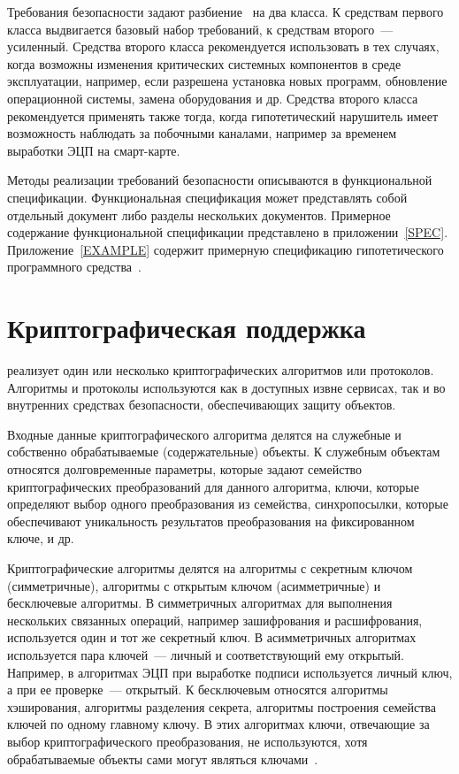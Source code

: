 Требования безопасности задают разбиение~\TOE
на два класса. К средствам первого класса выдвигается 
базовый набор требований, к средствам второго~--- усиленный.
%
Средства второго класса рекомендуется использовать
в тех случаях, когда возможны изменения критических системных 
компонентов в среде эксплуатации,
например, если разрешена установка новых программ,
обновление операционной системы, 
замена оборудования и др.
%
Средства второго класса рекомендуется применять также тогда,
когда гипотетический нарушитель имеет возможность 
наблюдать за побочными каналами,
например за временем выработки ЭЦП на смарт-карте.
	
Методы реализации требований безопасности 
описываются в функциональной спецификации. 
%
Функциональная спецификация может представлять собой 
отдельный документ либо разделы нескольких документов.
%
Примерное содержание функциональной спецификации представлено 
в приложении~\ref{SPEC}.
%
Приложение~\ref{EXAMPLE} содержит примерную спецификацию гипотетического 
программного средства~\CryptoDisk.

\section{Криптографическая поддержка}

\TOE реализует один или несколько криптографических алгоритмов 
или протоколов. Алгоритмы и протоколы используются 
как в доступных извне сервисах, 
так и во внутренних средствах безопасности, 
обеспечивающих защиту объектов.

Входные данные криптографического алгоритма делятся на служебные и собственно 
обрабатываемые (содержательные) объекты. 
К служебным объектам относятся долговременные параметры, 
которые задают семейство криптографических преобразований для данного алгоритма,
ключи, которые определяют выбор одного преобразования из семейства, 
синхропосылки, которые обеспечивают уникальность результатов 
преобразования на фиксированном ключе, и др.

Криптографические алгоритмы делятся на
алгоритмы с секретным ключом (симметричные),
алгоритмы с открытым ключом (асимметричные) 
и бесключевые алгоритмы.
%
В симметричных алгоритмах для выполнения нескольких связанных
операций, например зашифрования и расшифрования,
используется один и тот же секретный ключ. 
%
В асимметричных алгоритмах используется пара ключей~--- 
личный и соответствующий ему открытый.
Например, в алгоритмах ЭЦП при выработке подписи используется 
личный ключ, а при ее проверке~--- открытый.
%
К бесключевым относятся алгоритмы хэширования, 
алгоритмы разделения секрета, 
алгоритмы построения семейства ключей по одному главному ключу. 
В этих алгоритмах ключи, отвечающие за выбор 
криптографического преобразования,
не используются, хотя обрабатываемые объекты сами могут являться 
ключами~.

